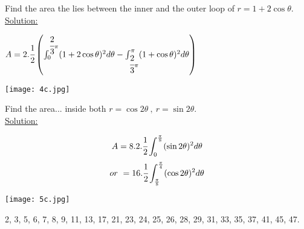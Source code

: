 \noindent{\color{smalt(darkpowderblue)}\rule{\linewidth}{.2mm}}
\begin{example}
Find the area the lies between the inner and the outer loop of $r=1+2\cos\theta$. \\
{\color{smalt(darkpowderblue)} \underline{Solution:}}\\ 
\begin{minipage}{0.75\textwidth}
$A=2.\cfrac{1}{2}\left(\int_0^{\cfrac{2}{3}\pi}(1+2\cos\theta)^2 d\theta-\int_{\cfrac{2}{3}\pi}^\pi(1+\cos\theta)^2d \theta\right)$
\end{minipage}
\begin{minipage}{0.5\textwidth}
\texttt{[image: 4c.jpg]}
\end{minipage}
\end{example}
\noindent{\color{smalt(darkpowderblue)}\rule{\linewidth}{.2mm}}
\begin{example}
Find the area... inside both $r=\cos2\theta~,~r=\sin2\theta.$\\
{\color{smalt(darkpowderblue)} \underline{Solution:}}
\begin{minipage}{0.5\textwidth}
$$A=8.2.\cfrac{1}{2}\int_0^\frac{\pi}{8}(\sin2\theta)^2 d\theta$$
$$or~=16.\cfrac{1}{2}\int_\frac{\pi}{8}^\frac{\pi}{4}(\cos2\theta)^2 d\theta$$
\end{minipage}
\begin{minipage}{0.5\textwidth}
\texttt{[image: 5c.jpg]}
\end{minipage}
\end{example}
\noindent{\color{smalt(darkpowderblue)}\rule{\linewidth}{.2mm}}
\begin{problem}
2, 3, 5, 6, 7, 8, 9, 11, 13, 17, 21, 23, 24, 25, 26, 28, 29, 31, 33, 35, 37, 41, 45, 47.
\end{problem}